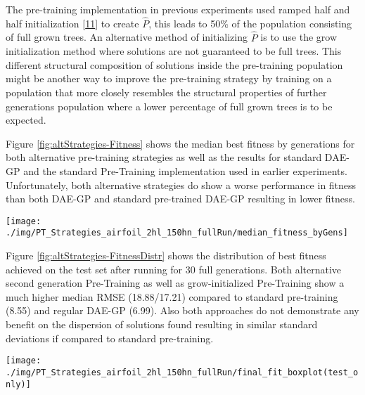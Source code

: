 \documentclass[
  11pt,
]{article}
\let\origfigure\figure
\let\endorigfigure\endfigure
\renewenvironment{figure}[1][2] {
    \expandafter\origfigure\expandafter[H]
} {
    \endorigfigure
}
\begin{document}
The pre-training implementation in previous experiments used ramped half and half initialization {[}\protect\hyperlink{ref-Koza1993GeneticP}{11}{]} to create \(\hat{P}\), this leads to 50\% of the population consisting of full grown trees. An alternative method of initializing \(\hat{P}\) is to use the grow initialization method where solutions are not guaranteed to be full trees. This different structural composition of solutions inside the pre-training population might be another way to improve the pre-training strategy by training on a population that more closely resembles the structural properties of further generations population where a lower percentage of full grown trees is to be expected.

Figure \ref{fig:altStrategies-Fitness} shows the median best fitness by generations for both alternative pre-training strategies as well as the results for standard DAE-GP and the standard Pre-Training implementation used in earlier experiments. Unfortunately, both alternative strategies do show a worse performance in fitness than both DAE-GP and standard pre-trained DAE-GP resulting in lower fitness.

\begin{figure}[c]

{\centering \texttt{[image: ./img/PT\_Strategies\_airfoil\_2hl\_150hn\_fullRun/median\_fitness\_byGens]} 

}

\caption{Best Fitness over 30 Generations - Airfoil - Alternative Pre-Training Strategies }\label{fig:altStrategies-Fitness}
\end{figure}

Figure \ref{fig:altStrategies-FitnessDistr} shows the distribution of best fitness achieved on the test set after running for 30 full generations. Both alternative second generation Pre-Training as well as grow-initialized Pre-Training show a much higher median RMSE (18.88/17.21) compared to standard pre-training (8.55) and regular DAE-GP (6.99). Also both approaches do not demonstrate any benefit on the dispersion of solutions found resulting in similar standard deviations if compared to standard pre-training.

\begin{figure}[c]

{\centering \texttt{[image: ./img/PT\_Strategies\_airfoil\_2hl\_150hn\_fullRun/final\_fit\_boxplot(test\_only)]} 

}

\caption{Best Fitness on Test Set after 30 Generations - Airfoil - Alternative Pre-Training Strategies}\label{fig:altStrategies-FitnessDistr}
\end{figure}
\end{document}
